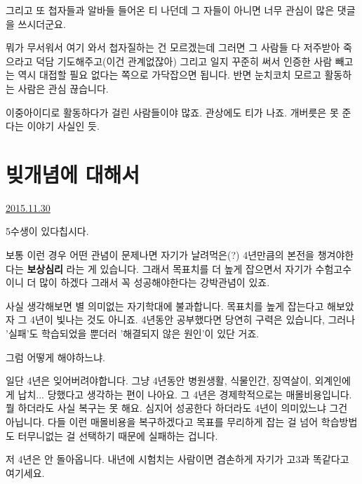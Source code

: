 그리고 또 첩자들과 알바들 들어온 티 나던데
그 자들이 아니면 너무 관심이 많은 댓글을 쓰시더군요.
\vspace{5mm}

뭐가 무서워서 여기 와서 첩자질하는 건 모르겠는데 그러면 그 사람들 다 저주받아 죽으라고 덕담 기도해주고(이건 관계없잖아)
그리고 일지 꾸준히 써서 인증한 사람 빼고는 역시 대접할 필요 없다는 쪽으로 가닥잡으면 됩니다.
반면 눈치코치 모르고 활동하는 사람은 관심 끊습니다.
\vspace{5mm}

이중아이디로 활동하다가 걸린 사람들이야 많죠. 관상에도 티가 나죠.
개버릇은 못 준다는 이야기 사실인 듯.
\vspace{5mm}




\section{빚개념에 대해서}
\href{https://www.kockoc.com/Apoc/518747}{2015.11.30}

\vspace{5mm}

5수생이 있다칩시다.
\vspace{5mm}

보통 이런 경우 어떤 관념이 문제나면
자기가 날려먹은(?) 4년만큼의 본전을 챙겨야한다는 \textbf{보상심리} 라는 게 있습니다.
그래서 목표치를 더 높게 잡으면서 자기가 수험고수이니 더 많이 하겠다 그래서 꼭 성공해야한다는 강박관념이 있죠.
\vspace{5mm}

사실 생각해보면 별 의미없는 자기학대에 불과합니다.
목표치를 높게 잡는다고 해보았자 그 4년이 빛나는 것도 아니죠.
4년동안 공부했다면 당연히 구력은 있습니다, 그러나 '실패'도 학습되었을 뿐더러 '해결되지 않은 원인'이 있단 거죠.
\vspace{5mm}

그럼 어떻게 해야하느냐.
\vspace{5mm}

일단 4년은 잊어버려야합니다. 그냥 4년동안 병원생활, 식물인간, 징역살이, 외계인에게 납치... 당했다고 생각하는 편이 나아요.
그 4년은 경제학적으로는 매몰비용입니다. 뭘 하더라도 사실 복구는 못 해요. 심지어 성공한다 하더라도 4년이 의미있느냐 그건 아닙니다.
다들 이런 매몰비용을 복구하겠다고 목표를 무리하게 잡는 걸 넘어 학습방법도 터무니없는 걸 선택하기 때문에 실패하는 겁니다.
\vspace{5mm}

저 4년은 안 돌아옵니다.
내년에 시험치는 사람이면 겸손하게 자기가 고3과 똑같다고 여기세요.
\vspace{5mm}

